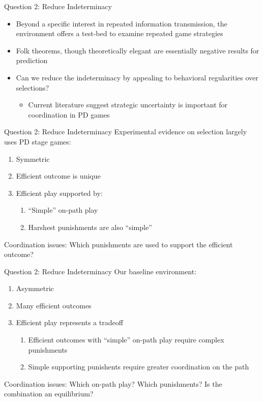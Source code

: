 \documentclass{beamer}
\begin{document}
\begin{frame}{Question 2: Reduce Indeterminacy}
    \begin{itemize}
        \item Beyond a specific interest in repeated information transmission, the
        environment offers a test-bed to examine repeated game strategies\bigskip{}
        \item Folk theorems, though theoretically elegant are essentially negative
        results for prediction
        \item Can we reduce the indeterminacy by appealing to behavioral regularities
        over selections?
            \begin{itemize}
                \item Current literature suggest strategic uncertainty is important for
                coordination in PD games
            \end{itemize}
    \end{itemize}
\end{frame}

\begin{frame}{Question 2: Reduce Indeterminacy}
Experimental evidence on selection largely uses PD stage games:
    \begin{enumerate}
        \item Symmetric
        \item Efficient outcome is unique
        \item Efficient play supported by:
            \begin{enumerate}
            \item ``Simple'' on-path play
            \item Harshest punishments are also ``simple''
            \end{enumerate}
    \end{enumerate}
Coordination issues: Which punishments are used to support the efficient
outcome?

\end{frame}

\begin{frame}{Question 2: Reduce Indeterminacy}
Our baseline environment:
    \begin{enumerate}
        \item Asymmetric
        \item Many efficient outcomes
        \item Efficient play represents a tradeoff
            \begin{enumerate}
            \item Efficient outcomes with ``simple'' on-path play require complex punishments
            \item Simple supporting punishents require greater coordination on the path
            \end{enumerate}
    \end{enumerate}
Coordination issues: Which on-path play? Which punishments? Is the
combination an equilibrium?
\end{frame}
\end{document}
